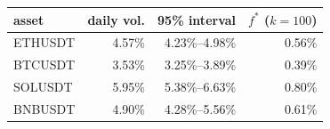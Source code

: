 \begin{tabular}{|l|r|r|r|}
\hline
\rowcolor{gray!15}asset & daily vol. & 95\% interval & $f^*$ ($k{=}100$) \\
\hline
ETHUSDT & 4.57\% & 4.23\%--4.98\% & 0.56\% \\
\hline
BTCUSDT & 3.53\% & 3.25\%--3.89\% & 0.39\% \\
\hline
SOLUSDT & 5.95\% & 5.38\%--6.63\% & 0.80\% \\
\hline
BNBUSDT & 4.90\% & 4.28\%--5.56\% & 0.61\% \\
\hline
\end{tabular}
